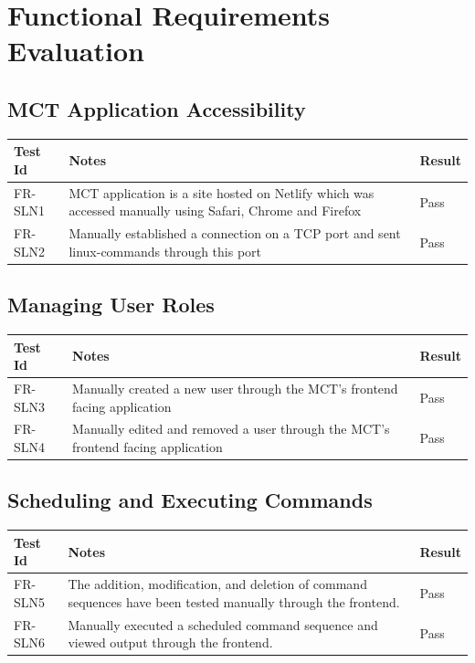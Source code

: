 \documentclass[12pt, titlepage]{article}
\begin{document}
\newpage


\section{Functional Requirements Evaluation}

\subsection{MCT Application Accessibility}

\begin{center}
\begin{tabular}{|p{2cm} | p{8cm} |p{2cm}| }
\hline
\textbf{Test Id} & \textbf{Notes} & \textbf{Result} \\
\hline
FR-SLN1 & MCT application is a site hosted on Netlify which was accessed manually using Safari, Chrome and Firefox & Pass \\
\hline
FR-SLN2 & Manually established a connection on a TCP port and sent linux-commands through this port & Pass \\
\hline

\end{tabular}
\end{center}

\subsection{Managing User Roles}

\begin{center}
\begin{tabular}{|p{2cm} | p{8cm} |p{2cm}| }
\hline
\textbf{Test Id} & \textbf{Notes} & \textbf{Result} \\
\hline
FR-SLN3 & Manually created a new user through the MCT's frontend facing application & Pass \\
\hline
FR-SLN4 & Manually edited and removed a user through the MCT's frontend facing application & Pass \\
\hline

\end{tabular}
\end{center}

\subsection{Scheduling and Executing Commands}

\begin{center}
\begin{tabular}{|p{2cm} | p{8cm} |p{2cm}| }
\hline
\textbf{Test Id} & \textbf{Notes} & \textbf{Result} \\
\hline
FR-SLN5 & The addition, modification, and deletion of command sequences have been tested manually through the frontend. & Pass \\
\hline
FR-SLN6 & Manually executed a scheduled command sequence and viewed output through the frontend. & Pass \\
\hline

\end{tabular}
\end{center}
\end{document}
